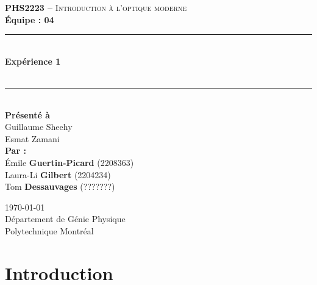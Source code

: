 \documentclass[11pt,letterpaper]{article}
\begin{document}
\begin{titlepage}
\center

\begin{figure}
\end{figure}
\vspace*{2 cm}

\textsc{\Large \textbf{PHS2223 --} Introduction à l'optique moderne}\\[0.5cm]
\large{\textbf{Équipe : 04}}\\[1.5cm]

\rule{\linewidth}{0.5mm} \\[0.5cm]
\Large{\textbf{Expérience 1}} \\[0.2cm]
\\
\rule{\linewidth}{0.2mm} \\[2.3cm]

\large{\textbf{Présenté à}\\
  Guillaume Sheehy\\
  Esmat Zamani\\[2.5cm]
  \textbf{Par :}\\
  Émile \textbf{Guertin-Picard} (2208363)\\
  Laura-Li \textbf{Gilbert} (2204234)\\
  Tom \textbf{Dessauvages} (???????)\\[3cm]}

\large{\today\\
Département de Génie Physique\\
Polytechnique Montréal\\}

\end{titlepage}


\tableofcontents
{}
\newpage

\pagestyle{fancy}
\setlength{\headheight}{14pt}
\renewcommand{\headrulewidth}{0pt}
\fancyfoot[R]{\thepage}

\pagestyle{fancy}
\fancyhf{}
\renewcommand{\headrulewidth}{1pt}
\fancyhead[R]{\today}
\fancyfoot[R]{\thepage}

\setcounter{page}{1}


\section{Introduction}
\end{document}
